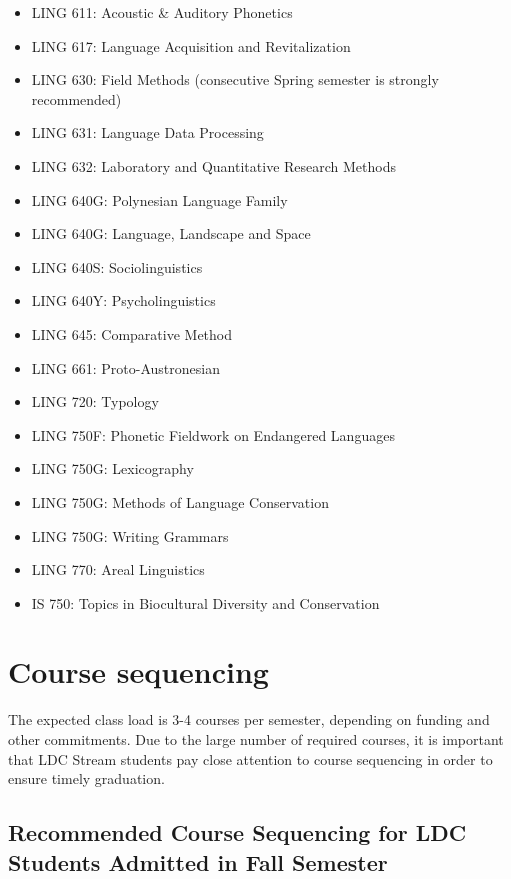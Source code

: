\documentclass[
]{book}
\providecommand{\tightlist}{%
  \setlength{\itemsep}{0pt}\setlength{\parskip}{0pt}}
\begin{document}
\begin{itemize}
\tightlist
\item
  LING 611: Acoustic \& Auditory Phonetics
\item
  LING 617: Language Acquisition and Revitalization
\item
  LING 630: Field Methods (consecutive Spring semester is strongly recommended)
\item
  LING 631: Language Data Processing
\item
  LING 632: Laboratory and Quantitative Research Methods
\item
  LING 640G: Polynesian Language Family
\item
  LING 640G: Language, Landscape and Space
\item
  LING 640S: Sociolinguistics
\item
  LING 640Y: Psycholinguistics
\item
  LING 645: Comparative Method
\item
  LING 661: Proto-Austronesian
\item
  LING 720: Typology
\item
  LING 750F: Phonetic Fieldwork on Endangered Languages
\item
  LING 750G: Lexicography
\item
  LING 750G: Methods of Language Conservation
\item
  LING 750G: Writing Grammars
\item
  LING 770: Areal Linguistics
\item
  IS 750: Topics in Biocultural Diversity and Conservation
\end{itemize}

\section{Course sequencing}\label{course-sequencing}

The expected class load is 3-4 courses per semester, depending on funding and other commitments.
Due to the large number of required courses, it is important that LDC Stream students pay close attention to course sequencing in order to ensure timely graduation.

\subsection{Recommended Course Sequencing for LDC Students Admitted in Fall Semester}\label{recommended-course-sequencing-for-ldc-students-admitted-in-fall-semester}
\end{document}
